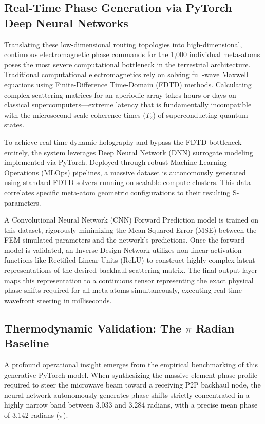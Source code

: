\documentclass[11pt,a4paper]{article}
\begin{document}
\subsection{Real-Time Phase Generation via PyTorch Deep Neural Networks}

Translating these low-dimensional routing topologies into high-dimensional, continuous electromagnetic phase commands for the 1,000 individual meta-atoms poses the most severe computational bottleneck in the terrestrial architecture.\cite{ref6} Traditional computational electromagnetics rely on solving full-wave Maxwell equations using Finite-Difference Time-Domain (FDTD) methods.\cite{ref6} Calculating complex scattering matrices for an aperiodic array takes hours or days on classical supercomputers---extreme latency that is fundamentally incompatible with the microsecond-scale coherence times ($T_2$) of superconducting quantum states.\cite{ref6}

To achieve real-time dynamic holography and bypass the FDTD bottleneck entirely, the system leverages Deep Neural Network (DNN) surrogate modeling implemented via PyTorch.\cite{ref6} Deployed through robust Machine Learning Operations (MLOps) pipelines, a massive dataset is autonomously generated using standard FDTD solvers running on scalable compute clusters.\cite{ref6} This data correlates specific meta-atom geometric configurations to their resulting S-parameters.\cite{ref6}

A Convolutional Neural Network (CNN) Forward Prediction model is trained on this dataset, rigorously minimizing the Mean Squared Error (MSE) between the FEM-simulated parameters and the network's predictions.\cite{ref6} Once the forward model is validated, an Inverse Design Network utilizes non-linear activation functions like Rectified Linear Units (ReLU) to construct highly complex latent representations of the desired backhaul scattering matrix.\cite{ref6} The final output layer maps this representation to a continuous tensor representing the exact physical phase shifts required for all meta-atoms simultaneously, executing real-time wavefront steering in milliseconds.\cite{ref6}

\subsection{Thermodynamic Validation: The $\pi$ Radian Baseline}

A profound operational insight emerges from the empirical benchmarking of this generative PyTorch model. When synthesizing the massive element phase profile required to steer the microwave beam toward a receiving P2P backhaul node, the neural network autonomously generates phase shifts strictly concentrated in a highly narrow band between 3.033 and 3.284 radians, with a precise mean phase of 3.142 radians ($\pi$).\cite{ref6}
\end{document}
